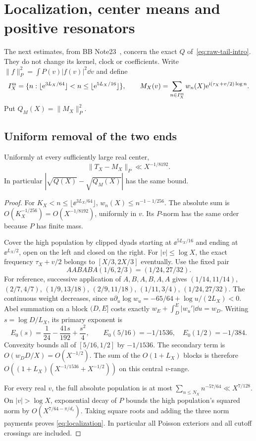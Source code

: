 \section{Localization, center means and positive resonators}\label{sec:means}

The next estimates, from BB Note23~\cite{BB23}, concern the exact $Q$
of~\eqref{eq:raw-tail-intro}.
They do not change its kernel, clock or coefficients. Write
$\|f\|_P^2=\int P(v)|f(v)|^2\dd v$ and define
\[
 I_X^{\rm m}=\{n:\lfloor\mathrm e^{3L_X/64}\rfloor<n\le
                       \lfloor\mathrm e^{5L_X/16}\rfloor\},\qquad
 M_X(v)=\sum_{n\in I_X^{\rm m}}w_n(X)\mathrm e^{\mathrm i(\tau_X+v/2)\log n}.
\]
Put $Q_M(X)=\|M_X\|_P^2$.

\subsection{Uniform removal of the two ends}

\begin{theorem}\label{thm:localization}
Uniformly at every sufficiently large real center,
\begin{equation}\label{eq:localization}
 \|T_X-M_X\|_P\ll X^{-1/8192}.
\end{equation}
In particular $|\sqrt{Q(X)}-\sqrt{Q_M(X)}|$ has the same bound.
\end{theorem}

\begin{proof}
For $K_X<n\le\lfloor\ee^{3L_X/64}\rfloor$,
$w_n(X)\le n^{-1-1/256}$. The absolute sum is
$O(K_X^{-1/256})=O(X^{-1/8192})$, uniformly in $v$.
Its $P$-norm has the same order because $P$ has finite mass.

Cover the high population by clipped dyads starting at
$\ee^{5L_X/16}$ and ending at $\ee^{L_X/2}$, open on the left
and closed on the right. For $|v|\le\log X$, the exact frequency
$\tau_X+v/2$ belongs to $[X/3,2X/3]$ eventually.
Use the fixed pair
\[
 AABABA(1/6,2/3)=(1/24,27/32).
\]
For reference, successive application of $A,B,A,B,A,A$ gives
$(1/14,11/14)$, $(2/7,4/7)$, $(1/9,13/18)$,
$(2/9,11/18)$, $(1/11,3/4)$, $(1/24,27/32)$.
The continuous weight decreases, since
$u\partial_u\log w_u=-65/64+\log u/(2L_X)<0$.
Abel summation on a block $(D,E]$ costs exactly
$w_E+\int_D^E|w_u'|\dd u=w_D$.
Writing $s=\log D/L_X$, its primary exponent is
\[
 E_0(s)=\frac1{24}-\frac{41s}{192}+\frac{s^2}{4},\qquad
 E_0(5/16)=-1/1536,\quad E_0(1/2)=-1/384.
\]
Convexity bounds all of $[5/16,1/2]$ by $-1/1536$.
The secondary term is $O(w_DD/X)=O(X^{-1/2})$.
The sum of the $O(1+L_X)$ blocks is therefore
$O((1+L_X)(X^{-1/1536}+X^{-1/2}))$ on this central $v$-range.

For every real $v$, the full absolute population is at most
$\sum_{n\le N_X}n^{-57/64}\ll X^{7/128}$.
On $|v|>\log X$, exponential decay of $P$ bounds the high population's
squared norm by $O(X^{7/64-\pi/d_s})$.
Taking square roots and adding the three norm payments proves
\eqref{eq:localization}. In particular all Poisson exteriors and
all cutoff crossings are included.
\end{proof}

